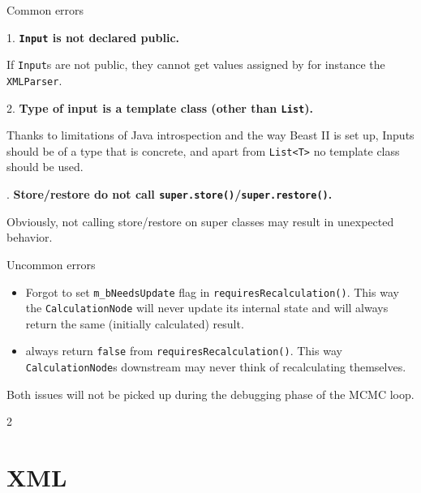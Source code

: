 \documentclass{beamer}
\def\part{2}
\theoremstyle{definition}
\begin{document}
\begin{frame}{Common errors}

1. {\bf\color{red} {\tt Input} is not declared public.}

If {\tt Input}s are not public, they cannot get values assigned by for
instance the {\tt XMLParser}.\vskip1cm

\pause

2. {\bf\color{red} Type of input is a template class (other than {\tt List}).}

Thanks to limitations of Java introspection and the way Beast II is set up, Inputs should be 
of a type that is concrete, and apart from {\tt List<T>} no template class should be used.\vskip1cm

. {\bf\color{red} Store/restore do not call {\tt super.store()}/{\tt super.restore()}.}

Obviously, not calling store/restore on super classes may result in unexpected behavior.

\end{frame}


\begin{frame}{Uncommon errors}
\begin{itemize}
\item Forgot to set {\tt m\_bNeedsUpdate} flag in {\tt requiresRecalculation()}. This way
the {\tt CalculationNode} will never update its internal state and will always return the
same (initially calculated) result.
\item always return {\tt false} from {\tt requiresRecalculation()}. This way {\tt CalculationNode}s 
downstream may never think of recalculating themselves.
\end{itemize}
Both issues will not be picked up during the debugging phase
of the MCMC loop.

\end{frame}


\fi
\if \part 2




\section{XML}
\end{document}
